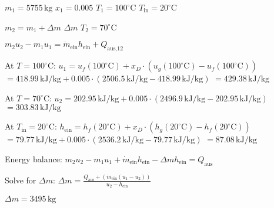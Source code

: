 \( m_1 = 5755 \, \text{kg} \)  
\( x_1 = 0.005 \)  
\( T_1 = 100^\circ \text{C} \)  
\( T_{\text{in}} = 20^\circ \text{C} \)  

\( m_2 = m_1 + \Delta m \)  
\( \Delta m \)  
\( T_2 = 70^\circ \text{C} \)  

\( m_2 u_2 - m_1 u_1 = \dot{m}_{\text{ein}} h_{\text{ein}} + Q_{\text{aus,12}} \)  

At \( T = 100^\circ \text{C} \):  
\( u_1 = u_f(100^\circ \text{C}) + x_D \cdot (u_g(100^\circ \text{C}) - u_f(100^\circ \text{C})) \)  
\( = 418.99 \, \text{kJ/kg} + 0.005 \cdot (2506.5 \, \text{kJ/kg} - 418.99 \, \text{kJ/kg}) \)  
\( = 429.38 \, \text{kJ/kg} \)  

At \( T = 70^\circ \text{C} \):  
\( u_2 = 202.95 \, \text{kJ/kg} + 0.005 \cdot (2496.9 \, \text{kJ/kg} - 202.95 \, \text{kJ/kg}) \)  
\( = 303.83 \, \text{kJ/kg} \)  

At \( T_{\text{in}} = 20^\circ \text{C} \):  
\( h_{\text{ein}} = h_f(20^\circ \text{C}) + x_D \cdot (h_g(20^\circ \text{C}) - h_f(20^\circ \text{C})) \)  
\( = 79.77 \, \text{kJ/kg} + 0.005 \cdot (2536.2 \, \text{kJ/kg} - 79.77 \, \text{kJ/kg}) \)  
\( = 87.08 \, \text{kJ/kg} \)  

Energy balance:  
\( m_2 u_2 - m_1 u_1 + \dot{m}_{\text{ein}} h_{\text{ein}} - \Delta m h_{\text{ein}} = Q_{\text{aus}} \)  

Solve for \( \Delta m \):  
\( \Delta m = \frac{Q_{\text{aus}} + (\dot{m}_{\text{ein}} (u_1 - u_2))}{u_2 - h_{\text{ein}}} \)  

\( \Delta m = 3495 \, \text{kg} \)